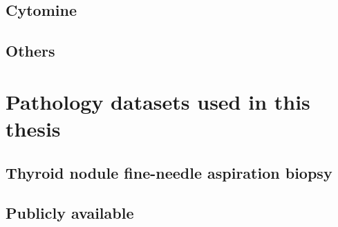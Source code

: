 \subsection{Cytomine}

\subsection{Others}

\section{Pathology datasets used in this thesis}
\label{sec:backdp:datasets}




\subsection{Thyroid nodule fine-needle aspiration biopsy}



\subsection{Publicly available}